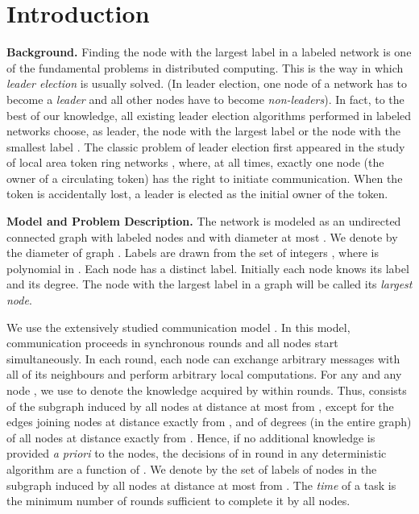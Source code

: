 \documentclass[11pt]{article}
\begin{document}
\vfill



\vfill

\thispagestyle{empty}
\setcounter{page}{0}
\pagebreak


\section{Introduction}



{\bf Background.} Finding the node with the largest label in a labeled network is one of the fundamental problems in distributed computing.
This is the way in which {\em leader election} is usually solved. (In leader election, one node of a network has to become a {\em leader}
and all other nodes have to become {\em non-leaders}). In fact, to the best of our knowledge, all existing leader election algorithms
performed in labeled networks choose, as leader, the node with the largest label or the node with the smallest label \cite{Ly}. The classic problem
of leader election first appeared in the study of local area token ring networks \cite{LL}, where, at all times, exactly one node (the owner of a circulating token) has the right to initiate
communication. When the token is accidentally lost, a leader is elected as the initial owner of the token.



\noindent
{\bf Model and Problem Description.} The network is modeled as an undirected connected graph with  labeled nodes and with diameter  at most .
We denote by  the diameter of graph .
Labels are drawn from the set of integers , where  is polynomial in . Each node has a distinct label.
Initially each node knows its label and its degree. The node with the largest label in a graph will be called its {\em largest node}.

We use the extensively studied  communication model \cite{Pe}. In this model, communication proceeds in synchronous
rounds and all nodes start simultaneously. In each round, each node
can exchange arbitrary messages with all of its neighbours and perform arbitrary local computations. For any  and any node , we use
 to denote     
the knowledge acquired by  within  rounds. Thus,   consists of the subgraph induced by all nodes at distance at most 
from , except for the edges joining nodes at distance exactly  from , and of degrees (in the entire graph) of all nodes at distance exactly  from . Hence,
if no additional knowledge is provided {\em a priori} to the nodes, the decisions of  in round  in any deterministic algorithm are a function of . We denote by  the set of labels of nodes in the subgraph induced by all nodes at distance at most 
from .
The {\em time} of a task is the minimum number of rounds sufficient to complete it by all nodes. 
\end{document}
